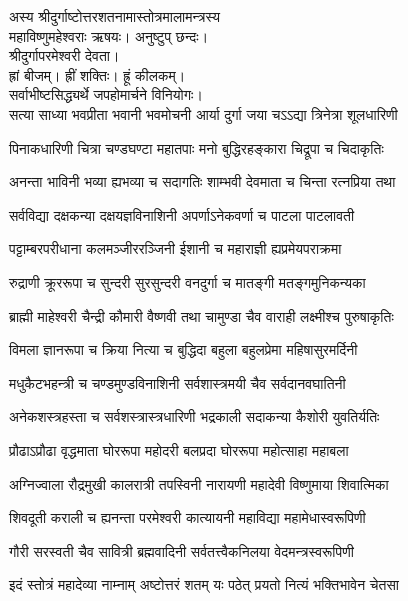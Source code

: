 
अस्य श्रीदुर्गाष्टोत्तरशतनामास्तोत्रमालामन्त्रस्य\\
महाविष्णुमहेश्वराः ऋषयः। अनुष्टुप् छन्दः।\\
श्रीदुर्गापरमेश्वरी देवता।\\
ह्रां बीजम्। ह्रीं शक्तिः। ह्रूं कीलकम्।\\
सर्वाभीष्टसिद्ध्यर्थे जपहोमार्चने विनियोगः।\\

\twolineshloka
{सत्या साध्या भवप्रीता भवानी भवमोचनी}
{आर्या दुर्गा जया चऽऽद्या त्रिनेत्रा शूलधारिणी}

\twolineshloka
{पिनाकधारिणी चित्रा चण्डघण्टा महातपाः}
{मनो बुद्धिरहङ्कारा चिद्रूपा च चिदाकृतिः}

\twolineshloka
{अनन्ता भाविनी भव्या ह्यभव्या च सदागतिः}
{शाम्भवी देवमाता च चिन्ता रत्नप्रिया तथा}

\twolineshloka
{सर्वविद्या दक्षकन्या दक्षयज्ञविनाशिनी}
{अपर्णाऽनेकवर्णा च पाटला पाटलावती}

\twolineshloka
{पट्टाम्बरपरीधाना कलमञ्जीररञ्जिनी}
{ईशानी च महाराज्ञी ह्यप्रमेयपराक्रमा}

\twolineshloka
{रुद्राणी क्रूररूपा च सुन्दरी सुरसुन्दरी}
{वनदुर्गा च मातङ्गी मतङ्गमुनिकन्यका}

\twolineshloka
{ब्राह्मी माहेश्वरी चैन्द्री कौमारी वैष्णवी तथा}
{चामुण्डा चैव वाराही लक्ष्मीश्च पुरुषाकृतिः}

\twolineshloka
{विमला ज्ञानरूपा च क्रिया नित्या च बुद्धिदा}
{बहुला बहुलप्रेमा महिषासुरमर्दिनी}

\twolineshloka
{मधुकैटभहन्त्री च चण्डमुण्डविनाशिनी}
{सर्वशास्त्रमयी चैव सर्वदानवघातिनी}

\twolineshloka
{अनेकशस्त्रहस्ता च सर्वशस्त्रास्त्रधारिणी}
{भद्रकाली सदाकन्या कैशोरी युवतिर्यतिः}

\twolineshloka
{प्रौढाऽप्रौढा वृद्धमाता घोररूपा महोदरी}
{बलप्रदा घोररूपा महोत्साहा महाबला}

\twolineshloka
{अग्निज्वाला रौद्रमुखी कालरात्री तपस्विनी}
{नारायणी महादेवी विष्णुमाया शिवात्मिका}

\twolineshloka
{शिवदूती कराली च ह्यनन्ता परमेश्वरी}
{कात्यायनी महाविद्या महामेधास्वरूपिणी}

\twolineshloka
{गौरी सरस्वती चैव सावित्री ब्रह्मवादिनी}
{सर्वतत्त्वैकनिलया वेदमन्त्रस्वरूपिणी}

\twolineshloka
{इदं स्तोत्रं महादेव्या नाम्नाम् अष्टोत्तरं शतम्}
{यः पठेत् प्रयतो नित्यं भक्तिभावेन चेतसा}

